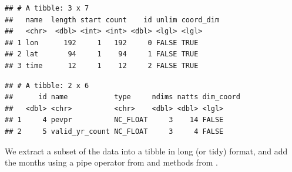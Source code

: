 \documentclass[krantz2]{krantz}\usepackage{knitr}%
\begin{document}
\begin{knitrout}\footnotesize
{}\color{fgcolor}\begin{kframe}
\begin{alltt}
\end{alltt}
\begin{verbatim}
## # A tibble: 3 x 7
##   name  length start count    id unlim coord_dim
##   <chr>  <dbl> <int> <int> <dbl> <lgl> <lgl>    
## 1 lon      192     1   192     0 FALSE TRUE     
## 2 lat       94     1    94     1 FALSE TRUE     
## 3 time      12     1    12     2 FALSE TRUE
\end{verbatim}
\end{kframe}
\end{knitrout}

\begin{knitrout}\footnotesize
{}\color{fgcolor}\begin{kframe}
\begin{alltt}
\end{alltt}
\begin{verbatim}
## # A tibble: 2 x 6
##      id name           type     ndims natts dim_coord
##   <dbl> <chr>          <chr>    <dbl> <dbl> <lgl>    
## 1     4 pevpr          NC_FLOAT     3    14 FALSE    
## 2     5 valid_yr_count NC_FLOAT     3     4 FALSE
\end{verbatim}
\end{kframe}
\end{knitrout}

We extract a subset of the data into a tibble in long (or tidy) format, and add
the months using a pipe operator from  and methods from .
\end{document}

